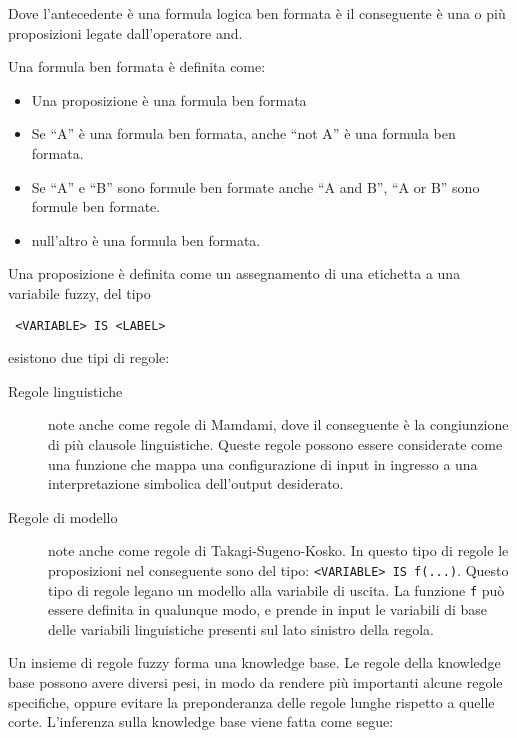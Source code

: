 Dove l'antecedente è una formula logica ben formata è il conseguente è una o più proposizioni legate dall'operatore and.

Una formula ben formata è definita come:

\begin{itemize}
 \item Una proposizione è una formula ben formata
 \item Se ``A'' è una formula ben formata, anche ``not A'' è una formula ben formata.
 \item Se ``A'' e ``B'' sono formule ben formate anche ``A and B'', ``A or B'' sono formule ben formate.
 \item null'altro è una formula ben formata.
\end{itemize}

Una proposizione è definita come un assegnamento di una etichetta a una variabile fuzzy, del tipo
\begin{verbatim}
 <VARIABLE> IS <LABEL>
\end{verbatim}

esistono due tipi di regole:
\begin{description}
 \item [Regole linguistiche] note anche come regole di Mamdami, dove il conseguente è la congiunzione di più clausole linguistiche. Queste regole possono essere considerate come una funzione che mappa una configurazione di input in ingresso a una interpretazione simbolica dell'output desiderato. 
 \item [Regole di modello] note anche come regole di Takagi-Sugeno-Kosko. In questo tipo di regole le proposizioni nel conseguente sono del tipo: \verb|<VARIABLE> IS f(...)|. Questo tipo di regole legano un modello alla variabile di uscita. La funzione \verb|f| può essere definita in qualunque modo, e prende in input le variabili di base delle variabili linguistiche presenti sul lato sinistro della regola.

\end{description}


Un insieme di regole fuzzy forma una knowledge base. Le regole della knowledge base possono avere diversi pesi, in modo da rendere più importanti alcune regole specifiche, oppure evitare la preponderanza delle regole lunghe rispetto a quelle corte.
L'inferenza sulla knowledge base viene fatta come segue: 

